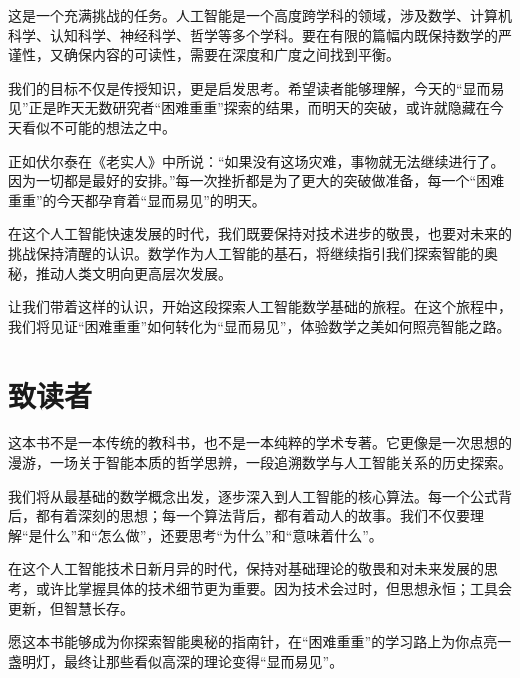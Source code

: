 这是一个充满挑战的任务。人工智能是一个高度跨学科的领域，涉及数学、计算机科学、认知科学、神经科学、哲学等多个学科。要在有限的篇幅内既保持数学的严谨性，又确保内容的可读性，需要在深度和广度之间找到平衡。

我们的目标不仅是传授知识，更是启发思考。希望读者能够理解，今天的“显而易见”正是昨天无数研究者“困难重重”探索的结果，而明天的突破，或许就隐藏在今天看似不可能的想法之中。

正如伏尔泰在《老实人》中所说：“如果没有这场灾难，事物就无法继续进行了。因为一切都是最好的安排。”每一次挫折都是为了更大的突破做准备，每一个“困难重重”的今天都孕育着“显而易见”的明天。

在这个人工智能快速发展的时代，我们既要保持对技术进步的敬畏，也要对未来的挑战保持清醒的认识。数学作为人工智能的基石，将继续指引我们探索智能的奥秘，推动人类文明向更高层次发展。

让我们带着这样的认识，开始这段探索人工智能数学基础的旅程。在这个旅程中，我们将见证“困难重重”如何转化为“显而易见”，体验数学之美如何照亮智能之路。

\section{致读者}

这本书不是一本传统的教科书，也不是一本纯粹的学术专著。它更像是一次思想的漫游，一场关于智能本质的哲学思辨，一段追溯数学与人工智能关系的历史探索。

我们将从最基础的数学概念出发，逐步深入到人工智能的核心算法。每一个公式背后，都有着深刻的思想；每一个算法背后，都有着动人的故事。我们不仅要理解“是什么”和“怎么做”，还要思考“为什么”和“意味着什么”。

在这个人工智能技术日新月异的时代，保持对基础理论的敬畏和对未来发展的思考，或许比掌握具体的技术细节更为重要。因为技术会过时，但思想永恒；工具会更新，但智慧长存。

愿这本书能够成为你探索智能奥秘的指南针，在“困难重重”的学习路上为你点亮一盏明灯，最终让那些看似高深的理论变得“显而易见”。


\newpage